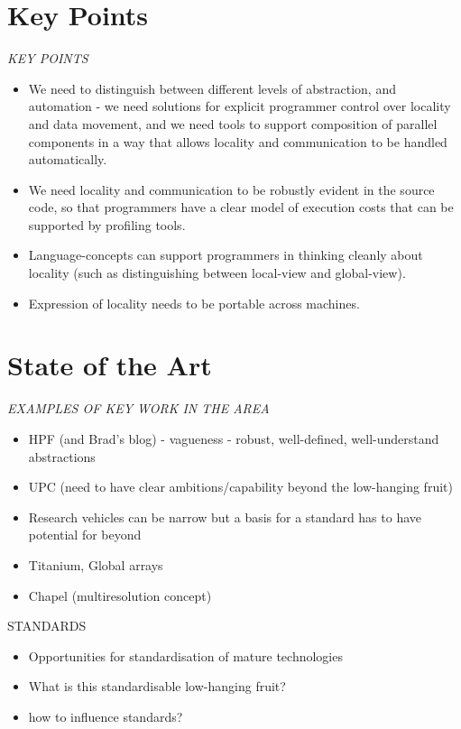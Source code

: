 \section{Key Points}

{\it
KEY POINTS
  \begin{itemize}
  \item We need to distinguish between different levels of abstraction, and automation - we need solutions for explicit programmer control over locality and data movement, and we need tools to support composition of parallel components in a way that allows locality and communication to be handled automatically.
  \item We need locality and communication to be robustly evident in the source code, so that programmers have a clear model of execution costs that can be supported by profiling tools.
  \item Language-concepts can support programmers in thinking cleanly about locality (such as distinguishing between local-view and global-view).
  \item Expression of locality needs to be portable across machines.
  \end{itemize}
}
\section{State of the Art}

{\it
EXAMPLES OF KEY WORK IN THE AREA
  \begin{itemize}
  \item HPF (and Brad’s blog) - vagueness - robust, well-defined, well-understand abstractions 
  \item UPC (need to have clear ambitions/capability beyond the low-hanging fruit)
  \item Research vehicles can be narrow but a basis for a standard has to have potential for beyond
  \item Titanium, Global arrays
  \item Chapel (multiresolution concept)
  \end{itemize}

STANDARDS
  \begin{itemize}
  \item Opportunities for standardisation of mature technologies
  \item What is this standardisable low-hanging fruit?
  \item how to influence standards?
  \end{itemize}

}


